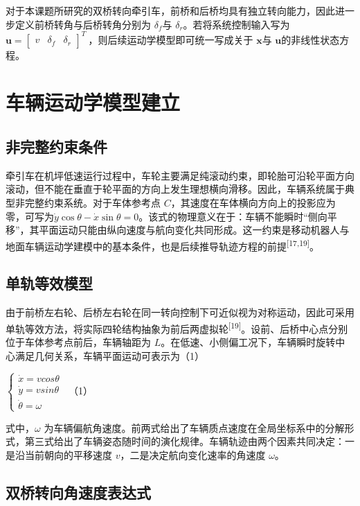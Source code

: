 对于本课题所研究的双桥转向牵引车，前桥和后桥均具有独立转向能力，因此进一步定义前桥转角与后桥转角分别为
\(\delta_{f}\)与
\(\delta_{r}\)。若将系统控制输入写为\(\mathbf{u} = \begin{bmatrix}
v & \delta_{f} & \delta_{r}
\end{bmatrix}^{T}\ ，\)则后续运动学模型即可统一写成关于 \(\mathbf{x}\)与
\(\mathbf{u}\)的非线性状态方程。

\section{车辆运动学模型建立}

\subsection{非完整约束条件}

牵引车在机坪低速运行过程中，车轮主要满足纯滚动约束，即轮胎可沿轮平面方向滚动，但不能在垂直于轮平面的方向上发生理想横向滑移。因此，车辆系统属于典型非完整约束系统。对于车体参考点
\(C\)，其速度在车体横向方向上的投影应为零，可写为\(\dot{y}\cos\theta - \dot{x}\sin\theta = 0\)。该式的物理意义在于：车辆不能瞬时“侧向平移”，其平面运动只能由纵向速度与航向变化共同形成。这一约束是移动机器人与地面车辆运动学建模中的基本条件，也是后续推导轨迹方程的前提\textsuperscript{[17,19]}。

\subsection{单轨等效模型}

由于前桥左右轮、后桥左右轮在同一转向控制下可近似视为对称运动，因此可采用单轨等效方法，将实际四轮结构抽象为前后两虚拟轮\textsuperscript{[19]}。设前、后桥中心点分别位于车体参考点前后，车辆轴距为
\(L\)。在低速、小侧偏工况下，车辆瞬时旋转中心满足几何关系，车辆平面运动可表示为（1）

\(\left\{ \begin{array}{r}
\dot{x} = vcos\theta \\
\dot{y} = vsin\theta \\
\dot{\theta} = \omega\ 
\end{array} \right.\ \) （1）

式中，\(\omega\)
为车辆偏航角速度。前两式给出了车辆质点速度在全局坐标系中的分解形式，第三式给出了车辆姿态随时间的演化规律。车辆轨迹由两个因素共同决定：一是沿当前朝向的平移速度
\(v\)，二是决定航向变化速率的角速度 \(\omega\)。

\subsection{双桥转向角速度表达式}

